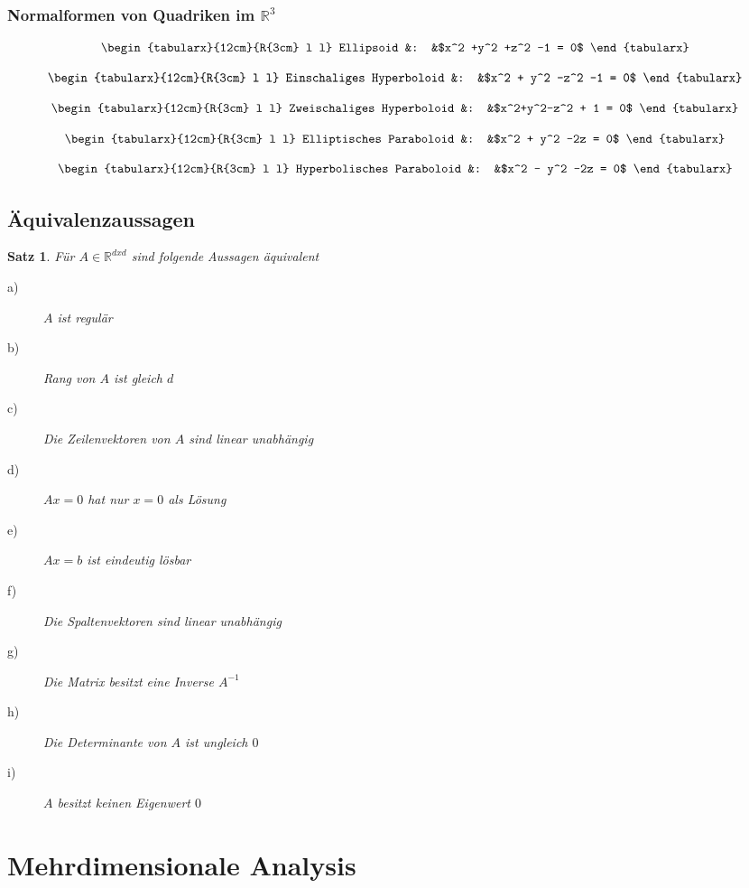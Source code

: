 \documentclass[12pt,a4paper]{report}%
\newtheorem{satz}{Satz}[section]
\numberwithin{equation}{section}
\newcommand{\R}{\mathbb{R}} %
\def\formTab#1#2{
\begin{equation}
  \begin{tabularx}{12cm}{R{3cm} l l}
    #1 &: &$#2$
  \end{tabularx}
\end{equation}
}
\numberwithin{equation}{subsection}
\begin{document}
     \subsubsection{Normalformen von Quadriken im $\R^3$}
     \formTab{Ellipsoid}{x^2 +y^2 +z^2 -1 = 0}
     \formTab{Einschaliges Hyperboloid}{x^2 + y^2 -z^2 -1 = 0}
     \formTab{Zweischaliges Hyperboloid}{x^2+y^2-z^2 + 1 = 0}
     \formTab{Elliptisches Paraboloid}{x^2 + y^2 -2z = 0}
     \formTab{Hyperbolisches Paraboloid}{x^2 - y^2 -2z = 0}
     
     
     
  \subsection{Äquivalenzaussagen}
  \begin{satz}
  Für $A \in \R^{dxd}$ sind folgende Aussagen äquivalent
  \begin{description}
   \item[a)] $A$ ist regulär
   \item[b)] Rang von $A$ ist gleich $d$
   \item[c)] Die Zeilenvektoren von $A$ sind linear unabhängig
   \item[d)] $Ax = 0$ hat nur $x=0$ als Lösung
   \item[e)] $Ax = b$ ist eindeutig lösbar
   \item[f)] Die Spaltenvektoren sind linear unabhängig
   \item[g)] Die Matrix besitzt eine Inverse $A^{-1}$
   \item[h)] Die Determinante von $A$ ist ungleich $0$
   \item[i)] $A$ besitzt keinen Eigenwert $0$
  \end{description}
  \end{satz}
  \newpage

\section{Mehrdimensionale Analysis}
\end{document}
